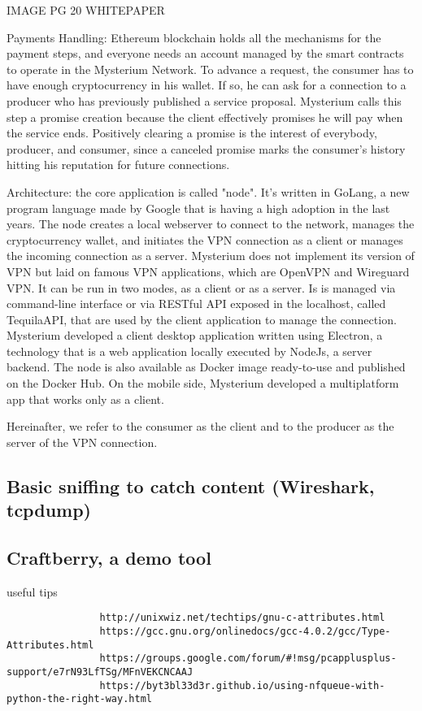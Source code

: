 \documentclass[]{article}
\begin{document}
	IMAGE PG 20 WHITEPAPER

	Payments Handling: Ethereum blockchain holds all the mechanisms for the payment steps, and everyone needs an account managed by the smart contracts to operate in the Mysterium Network. To advance a request, the consumer has to have enough cryptocurrency in his wallet. If so, he can ask for a connection to a producer who has previously published a service proposal. Mysterium calls this step a promise creation because the client effectively promises he will pay when the service ends.  Positively clearing a promise is the interest of everybody, producer, and consumer, since a canceled promise marks the consumer's history hitting his reputation for future connections.


	Architecture: the core application is called "node". It's written in GoLang, a new program language made by Google that is having a high adoption in the last years. The node creates a local webserver to connect to the network, manages the cryptocurrency wallet, and initiates the VPN connection as a client or manages the incoming connection as a server. Mysterium does not implement its version of VPN but laid on famous VPN applications, which are OpenVPN and Wireguard VPN. 
	It can be run in two modes, as a client or as a server.
	Is is managed via command-line interface or via RESTful API exposed in the localhost, called TequilaAPI, that are used by the client application to manage the connection. Mysterium developed a client desktop application written using Electron, a technology that is a web application locally executed by NodeJs, a server backend.
	The node is also available as Docker image ready-to-use and published on the Docker Hub. 
	On the mobile side, Mysterium developed a multiplatform app that works only as a client.

	Hereinafter, we refer to the consumer as the client and to the producer as the server of the VPN connection.


	\subsection{Basic sniffing to catch content (Wireshark, tcpdump)}
	\subsection{Craftberry, a demo tool}
			useful tips
			\begin{verbatim}
				http://unixwiz.net/techtips/gnu-c-attributes.html
				https://gcc.gnu.org/onlinedocs/gcc-4.0.2/gcc/Type-Attributes.html
				https://groups.google.com/forum/#!msg/pcapplusplus-support/e7rN93LfTSg/MFnVEKCNCAAJ
				https://byt3bl33d3r.github.io/using-nfqueue-with-python-the-right-way.html
			\end{verbatim}
			
\end{document}
